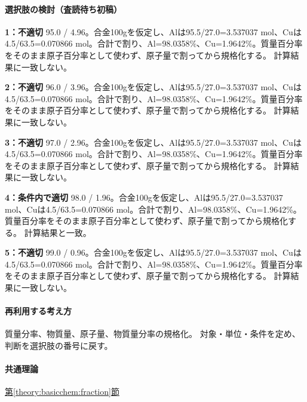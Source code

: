 \paragraph{選択肢の検討（査読待ち初稿）}\mbox{}\par

\noindent\textbf{1：不適切} 95.0 / 4.96。合金100gを仮定し、Alは95.5/27.0=\allowbreak{}3.537037 mol、Cuは4.5/63.5=\allowbreak{}0.070866 mol。合計で割り、Al=\allowbreak{}98.0358\%、Cu=\allowbreak{}1.9642\%。質量百分率をそのまま原子百分率として使わず、原子量で割ってから規格化する。 計算結果に一致しない。\par

\noindent\textbf{2：不適切} 96.0 / 3.96。合金100gを仮定し、Alは95.5/27.0=\allowbreak{}3.537037 mol、Cuは4.5/63.5=\allowbreak{}0.070866 mol。合計で割り、Al=\allowbreak{}98.0358\%、Cu=\allowbreak{}1.9642\%。質量百分率をそのまま原子百分率として使わず、原子量で割ってから規格化する。 計算結果に一致しない。\par

\noindent\textbf{3：不適切} 97.0 / 2.96。合金100gを仮定し、Alは95.5/27.0=\allowbreak{}3.537037 mol、Cuは4.5/63.5=\allowbreak{}0.070866 mol。合計で割り、Al=\allowbreak{}98.0358\%、Cu=\allowbreak{}1.9642\%。質量百分率をそのまま原子百分率として使わず、原子量で割ってから規格化する。 計算結果に一致しない。\par

\noindent\textbf{4：条件内で適切} 98.0 / 1.96。合金100gを仮定し、Alは95.5/27.0=\allowbreak{}3.537037 mol、Cuは4.5/63.5=\allowbreak{}0.070866 mol。合計で割り、Al=\allowbreak{}98.0358\%、Cu=\allowbreak{}1.9642\%。質量百分率をそのまま原子百分率として使わず、原子量で割ってから規格化する。 計算結果と一致。\par

\noindent\textbf{5：不適切} 99.0 / 0.96。合金100gを仮定し、Alは95.5/27.0=\allowbreak{}3.537037 mol、Cuは4.5/63.5=\allowbreak{}0.070866 mol。合計で割り、Al=\allowbreak{}98.0358\%、Cu=\allowbreak{}1.9642\%。質量百分率をそのまま原子百分率として使わず、原子量で割ってから規格化する。 計算結果に一致しない。\par

\paragraph{再利用する考え方} 質量分率、物質量、原子量、物質量分率の規格化。 対象・単位・条件を定め、判断を選択肢の番号に戻す。

\paragraph{共通理論} \hyperref[theory:basicchem:fraction]{第\ref*{theory:basicchem:fraction}節}

